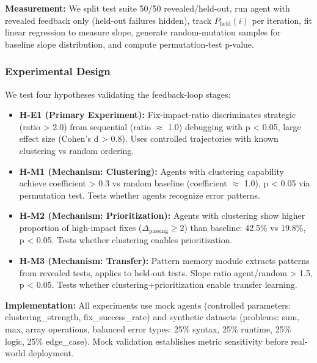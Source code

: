 \textbf{Measurement:} We split test suite 50/50 revealed/held-out, run agent with revealed feedback only (held-out failures hidden), track $P_{\text{held}}(i)$ per iteration, fit linear regression to measure slope, generate random-mutation samples for baseline slope distribution, and compute permutation-test p-value.

\subsubsection{Experimental Design}

We test four hypotheses validating the feedback-loop stages:

\begin{itemize}
\item \textbf{H-E1 (Primary Experiment):} Fix-impact-ratio discriminates strategic (ratio > 2.0) from sequential (ratio $\approx$ 1.0) debugging with p < 0.05, large effect size (Cohen's d > 0.8). Uses controlled trajectories with known clustering vs random ordering.
\end{itemize}

\begin{itemize}
\item \textbf{H-M1 (Mechanism: Clustering):} Agents with clustering capability achieve coefficient > 0.3 vs random baseline (coefficient $\approx$ 1.0), p < 0.05 via permutation test. Tests whether agents recognize error patterns.
\end{itemize}

\begin{itemize}
\item \textbf{H-M2 (Mechanism: Prioritization):} Agents with clustering show higher proportion of high-impact fixes ($\Delta_{\text{passing}} \geq 2$) than baseline: 42.5\% vs 19.8\%, p < 0.05. Tests whether clustering enables prioritization.
\end{itemize}

\begin{itemize}
\item \textbf{H-M3 (Mechanism: Transfer):} Pattern memory module extracts patterns from revealed tests, applies to held-out tests. Slope ratio agent/random > 1.5, p < 0.05. Tests whether clustering+prioritization enable transfer learning.
\end{itemize}

\textbf{Implementation:} All experiments use mock agents (controlled parameters: clustering\_strength, fix\_success\_rate) and synthetic datasets (problems: sum, max, array operations, balanced error types: 25\% syntax, 25\% runtime, 25\% logic, 25\% edge\_case). Mock validation establishes metric sensitivity before real-world deployment.

